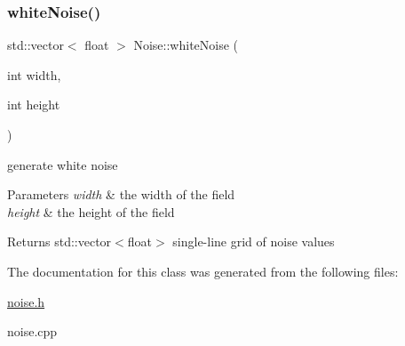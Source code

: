 \subsubsection{\texorpdfstring{white\+Noise()}{whiteNoise()}}
{\footnotesize\ttfamily std\+::vector$<$ float $>$ Noise\+::white\+Noise (\begin{DoxyParamCaption}\item[{int}]{width,  }\item[{int}]{height }\end{DoxyParamCaption})\hspace{0.3cm}{\ttfamily [static]}}



generate white noise 


\begin{DoxyParams}{Parameters}
{\em width} & the width of the field \\
\hline
{\em height} & the height of the field \\
\hline
\end{DoxyParams}
\begin{DoxyReturn}{Returns}
std\+::vector$<$float$>$ single-\/line grid of noise values 
\end{DoxyReturn}


The documentation for this class was generated from the following files\+:\begin{DoxyCompactItemize}
\item 
\hyperlink{noise_8h}{noise.\+h}\item 
noise.\+cpp\end{DoxyCompactItemize}
